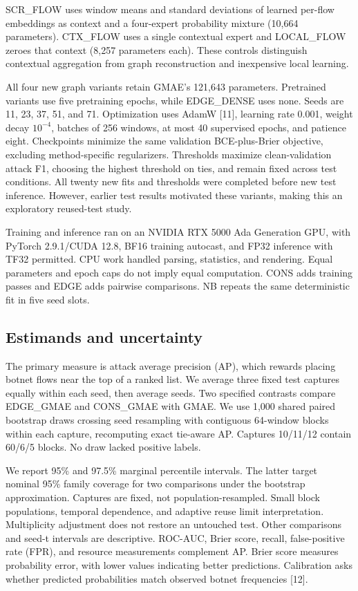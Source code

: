 \documentclass[11pt,letterpaper]{article}
\begin{document}
SCR\_FLOW uses window means and standard deviations of learned per-flow embeddings as context and a four-expert probability mixture (10,664 parameters). CTX\_FLOW uses a single contextual expert and LOCAL\_FLOW zeroes that context (8,257 parameters each). These controls distinguish contextual aggregation from graph reconstruction and inexpensive local learning.\par

All four new graph variants retain GMAE's 121,643 parameters. Pretrained variants use five pretraining epochs, while EDGE\_DENSE uses none. Seeds are 11, 23, 37, 51, and 71. Optimization uses AdamW [11], learning rate 0.001, weight decay \(10^{-4}\), batches of 256 windows, at most 40 supervised epochs, and patience eight. Checkpoints minimize the same validation BCE-plus-Brier objective, excluding method-specific regularizers. Thresholds maximize clean-validation attack F1, choosing the highest threshold on ties, and remain fixed across test conditions. All twenty new fits and thresholds were completed before new test inference. However, earlier test results motivated these variants, making this an exploratory reused-test study.\par

Training and inference ran on an NVIDIA RTX 5000 Ada Generation GPU, with PyTorch 2.9.1/CUDA 12.8, BF16 training autocast, and FP32 inference with TF32 permitted. CPU work handled parsing, statistics, and rendering. Equal parameters and epoch caps do not imply equal computation. CONS adds training passes and EDGE adds pairwise comparisons. NB repeats the same deterministic fit in five seed slots.\par

\subsection{Estimands and uncertainty}

The primary measure is attack average precision (AP), which rewards placing botnet flows near the top of a ranked list. We average three fixed test captures equally within each seed, then average seeds. Two specified contrasts compare EDGE\_GMAE and CONS\_GMAE with GMAE. We use 1,000 shared paired bootstrap draws crossing seed resampling with contiguous 64-window blocks within each capture, recomputing exact tie-aware AP. Captures 10/11/12 contain 60/6/5 blocks. No draw lacked positive labels.\par

We report 95\% and 97.5\% marginal percentile intervals. The latter target nominal 95\% family coverage for two comparisons under the bootstrap approximation. Captures are fixed, not population-resampled. Small block populations, temporal dependence, and adaptive reuse limit interpretation. Multiplicity adjustment does not restore an untouched test. Other comparisons and seed-t intervals are descriptive. ROC-AUC, Brier score, recall, false-positive rate (FPR), and resource measurements complement AP. Brier score measures probability error, with lower values indicating better predictions. Calibration asks whether predicted probabilities match observed botnet frequencies [12].\par
\end{document}

